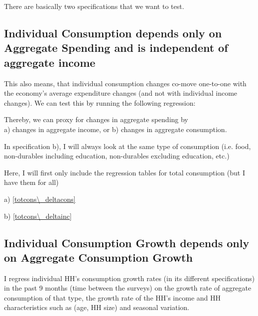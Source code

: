 \documentclass[12pt,a4paper]{article}
\begin{document}
There are basically two specifications that we want to test. 

\subsection*{Individual Consumption depends only on Aggregate Spending and is independent of aggregate income}

This also means, that individual consumption changes co-move one-to-one with the economy's average expenditure changes (and not with individual income changes). We can test this by running the following regression:


Thereby, we can proxy for changes in aggregate spending by \\
a) changes in aggregate income, or
b) changes in aggregate consumption.

In specification b), I will always look at the same type of consumption (i.e. food, non-durables including education, non-durables excluding education, etc.)

Here, I will first only include the regression tables for total consumption (but I have them for all)

a) \ref{totcons\_deltacons} 

b) \ref{totcons\_deltainc}


\subsection*{Individual Consumption Growth depends only on Aggregate Consumption Growth}

I regress individual HH's consumption growth rates (in its different specifications) in the past 9 months (time between the surveys) on the growth rate of aggregate consumption of that type, the growth rate of the HH's income and HH characteristics such as (age, HH size) and seasonal variation. 










\end{document}

